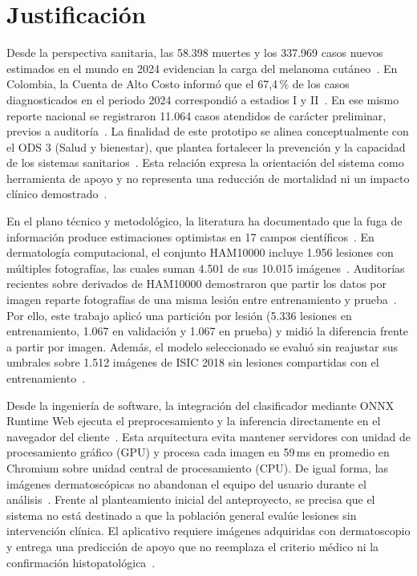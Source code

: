 \section{Justificación}

Desde la perspectiva sanitaria, las 58.398 muertes y los 337.969 casos nuevos estimados en el mundo en 2024 evidencian la carga del melanoma cutáneo~\cite{sung2026globocan,iarc2026melanoma}. En Colombia, la Cuenta de Alto Costo informó que el 67,4\,\% de los casos diagnosticados en el periodo 2024 correspondió a estadios I y II~\cite{cac2025melanoma}. En ese mismo reporte nacional se registraron 11.064 casos atendidos de carácter preliminar, previos a auditoría~\cite{cac2025melanoma}. La finalidad de este prototipo se alinea conceptualmente con el ODS 3 (Salud y bienestar), que plantea fortalecer la prevención y la capacidad de los sistemas sanitarios~\cite{un2024sdg}. Esta relación expresa la orientación del sistema como herramienta de apoyo y no representa una reducción de mortalidad ni un impacto clínico demostrado~\cite{vasey2022decideai}.

En el plano técnico y metodológico, la literatura ha documentado que la fuga de información produce estimaciones optimistas en 17 campos científicos~\cite{kapoor2023leakage}. En dermatología computacional, el conjunto HAM10000 incluye 1.956 lesiones con múltiples fotografías, las cuales suman 4.501 de sus 10.015 imágenes~\cite{tschandl2018ham10000}. Auditorías recientes sobre derivados de HAM10000 demostraron que partir los datos por imagen reparte fotografías de una misma lesión entre entrenamiento y prueba~\cite{abhishek2025quality}. Por ello, este trabajo aplicó una partición por lesión (5.336 lesiones en entrenamiento, 1.067 en validación y 1.067 en prueba) y midió la diferencia frente a partir por imagen. Además, el modelo seleccionado se evaluó sin reajustar sus umbrales sobre 1.512 imágenes de ISIC 2018 sin lesiones compartidas con el entrenamiento~\cite{codella2019isic2018}.

Desde la ingeniería de software, la integración del clasificador mediante ONNX Runtime Web ejecuta el preprocesamiento y la inferencia directamente en el navegador del cliente~\cite{ning2024onnxweb}. Esta arquitectura evita mantener servidores con unidad de procesamiento gráfico (GPU) y procesa cada imagen en 59\,ms en promedio en Chromium sobre unidad central de procesamiento (CPU). De igual forma, las imágenes dermatoscópicas no abandonan el equipo del usuario durante el análisis~\cite{ning2024onnxweb}. Frente al planteamiento inicial del anteproyecto, se precisa que el sistema no está destinado a que la población general evalúe lesiones sin intervención clínica. El aplicativo requiere imágenes adquiridas con dermatoscopio y entrega una predicción de apoyo que no reemplaza el criterio médico ni la confirmación histopatológica~\cite{amaral2025esmo}.

